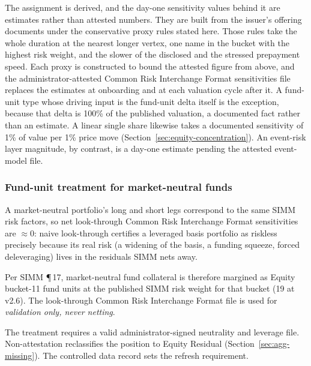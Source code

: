 The assignment is derived, and the day-one sensitivity values behind it are estimates rather
than attested numbers. They are built from the issuer's offering documents under the
conservative proxy rules stated here. Those rules take the whole
duration at the nearest longer vertex, one name in the bucket with the highest risk weight, and the
slower of the disclosed and the stressed prepayment speed.
Each proxy is constructed to bound the attested
figure from above, and the administrator-attested Common Risk Interchange Format sensitivities file replaces the
estimates at onboarding and at each valuation cycle after it. A fund-unit type whose driving
input is the fund-unit delta itself is the exception, because that delta is 100\% of the
published valuation, a documented fact rather than an estimate. A linear single share likewise takes a documented sensitivity of 1\% of value per 1\% price move (Section~\ref{sec:equity-concentration}). An event-risk layer magnitude,
by contrast, is a day-one estimate pending the attested event-model file.

\subsubsection{Fund-unit treatment for market-neutral funds}\label{sec:fund-unit}
A market-neutral portfolio's long and short legs correspond to the same SIMM risk factors, so net look-through Common Risk Interchange Format sensitivities are $\approx 0$: naive look-through certifies a leveraged basis portfolio as riskless precisely because its real risk (a widening of the basis, a funding squeeze, forced deleveraging) lives in the residuals SIMM nets away.

Per SIMM \P\,17, market-neutral fund collateral is therefore margined as Equity bucket-11 fund units at the published SIMM risk weight for that bucket (19 at v2.6). The look-through Common Risk Interchange Format file is used for \emph{validation only, never netting}.

The treatment requires a valid administrator-signed neutrality and leverage file. Non-attestation reclassifies the position to Equity Residual (Section~\ref{sec:agg-missing}). The controlled data record sets the refresh requirement.

